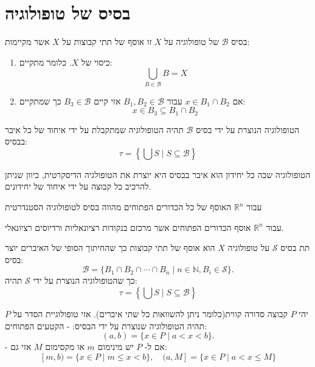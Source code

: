 \documentclass{tstextbook}
\begin{document}
\section{בסיס של טופולוגיה}

\begin{definition}
בסיס \(\mathcal{B}\) של טופולוגיה על \(X\) זו אוסף של תתי קבוצות על \(X\) אשר מקיימות:

  \begin{enumerate}
    \item כיסוי של \(X\). כלומר מתקיים: 
$$\bigcup_{B\in{\mathcal{B}}}B=X$$


    \item אם \(x \in B_{1}\cap B_{2}\) עבור \(B_{1},B_{2}\in \mathcal{B}\) אזי קיים \(B_{3} \in \mathcal{B}\) כך שמתקיים: 
$$x\in B_{3}\subseteq B_{1}\cap B_{2}$$


  \end{enumerate}
\end{definition}
\begin{definition}
הטופולוגיה הנוצרת על ידי בסיס \(\mathcal{B}\) תהיה הטופולוגיה שמתקבלת על ידי איחוד של כל איבר בבסיס:
$$\tau=\left\{\bigcup S\mid S\subseteq\mathcal{B}\right\}$$

\end{definition}
\begin{example}
הטופולוגיה שבה כל יחידון הוא איבר בבסיס היא יוצרת את הטופולגיה הדיסקרטית, כיוון שניתן להרכיב כל קבוצה על ידי איחוד של יחידונים.

\end{example}
\begin{example}
עבור \(\mathbb{R}^{n}\) האוסף של כל הכדורים הפתוחים מהווה בסיס לטופולוגיה הסטנדרטית

\end{example}
\begin{example}
עבור \(\mathbb{R}^{n}\) אוסף הכדורים הפתוחים אשר מרכזם בנקודות רציונאליות ורדיוסים רציונאלי.

\end{example}
\begin{definition}[תת בסיס]
תת בסיס \(\mathcal{S}\) על טופולוגיה \(X\) הוא אוסף של תתי קבוצות כך שהחיתוך הסופי של האיברים יוצר בסיס:
$${\mathcal{B}}=\{B_{1}\cap B_{2}\cap\cdots\cap B_{n}\mid n\in\mathbb{N},B_{i}\in{\mathcal{S}}\}.$$
כך שהטופולוגיה הנוצרת על ידי \(\mathcal{S}\) תהיה:
$$\tau=\left\{\bigcup S\mid S\subseteq\mathcal{B}\right\}$$

\end{definition}
\begin{definition}
יהי \(P\) קבוצה סדורה קווית(כלומר ניתן להשוואות כל שתי איברים). אזי טופולוגיית הסדר על \(P\) תהיה הטופולוגיה שנוצרת על ידי הבסיס:
- הקטעים הפתוחים:
$$(a,b)=\{x\in P\mid a<x<b\}.$$
- אם ל- \(P\) יש מינימום \(m\) או מקסימום \(M\) אזי גם:
$$[m,b)=\{x\in P\mid m\leq x<b\},\quad(a,M]=\{x\in P\mid a<x\leq M\}$$

\end{definition}
\end{document}
